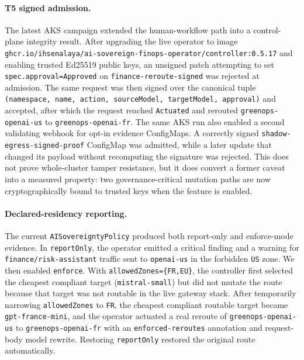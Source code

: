 \paragraph{T5 signed admission.}
The latest AKS campaign extended the human-workflow path into a control-plane integrity result. After upgrading the live operator to image \texttt{ghcr.io/ihsenalaya/ai-sovereign-finops-operator/controller:0.5.17} and enabling trusted Ed25519 public keys, an unsigned patch attempting to set \texttt{spec.approval=Approved} on \texttt{finance-reroute-signed} was rejected at admission. The same request was then signed over the canonical tuple \texttt{(namespace, name, action, sourceModel, targetModel, approval)} and accepted, after which the request reached \texttt{Actuated} and rerouted \texttt{greenops-openai-us} to \texttt{greenops-openai-fr}. The same AKS run also enabled a second validating webhook for opt-in evidence ConfigMaps. A correctly signed \texttt{shadow-egress-signed-proof} ConfigMap was admitted, while a later update that changed its payload without recomputing the signature was rejected. This does not prove whole-cluster tamper resistance, but it does convert a former caveat into a measured property: two governance-critical mutation paths are now cryptographically bound to trusted keys when the feature is enabled.

\paragraph{Declared-residency reporting.}
The current \texttt{AISovereigntyPolicy} produced both report-only and enforce-mode evidence. In \texttt{reportOnly}, the operator emitted a critical finding and a warning for \texttt{finance/risk-assistant} traffic sent to \texttt{openai-us} in the forbidden \texttt{US} zone. We then enabled \texttt{enforce}. With \texttt{allowedZones=\{FR,EU\}}, the controller first selected the cheapest compliant target (\texttt{mistral-small}) but did not mutate the route because that target was not routable in the live gateway stack. After temporarily narrowing \texttt{allowedZones} to \texttt{FR}, the cheapest compliant routable target became \texttt{gpt-france-mini}, and the operator actuated a real reroute of \texttt{greenops-openai-us} to \texttt{greenops-openai-fr} with an \texttt{enforced-reroutes} annotation and request-body model rewrite. Restoring \texttt{reportOnly} restored the original route automatically.

